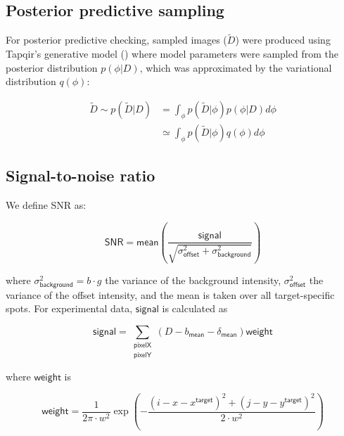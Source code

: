 \subsection{Posterior predictive sampling}

For posterior predictive checking, sampled images ($\widetilde{D}$) were produced using Tapqir's generative model () where model parameters were sampled from the posterior distribution $p(\phi|D)$, which was approximated by the variational distribution $q(\phi)$:

\begin{equation}
\begin{aligned}
    \widetilde{D} \sim p(\widetilde{D} | D) &= \int_\phi p(\widetilde{D} | \phi) p(\phi | D) d\phi \\
    &\simeq \int_\phi p(\widetilde{D} | \phi) q(\phi) d\phi
\end{aligned}
\end{equation}

\subsection{Signal-to-noise ratio}

We define SNR as:

\begin{equation}
    \mathsf{SNR} = \mathsf{mean} \left( \dfrac{\mathsf{signal}}{\sqrt{\sigma^2_{\mathsf{offset}} + \sigma^2_{\mathsf{background}}}} \right)
\end{equation}

where $\sigma^2_{\mathsf{background}} = b \cdot g$ the variance of the background intensity, $\sigma^2_{\mathsf{offset}}$ the variance of the offset intensity, and the mean is taken over all target-specific spots.  For experimental data, $\mathsf{signal}$ is calculated as

\begin{equation}
    \mathsf{signal} =  \sum_{\substack{\mathsf{pixelX} \\ \mathsf{pixelY}}} \left( D - b_{\mathsf{mean}} - \delta_\mathsf{mean} \right)  \mathsf{weight}
\end{equation}

where $\mathsf{weight}$ is

\begin{equation}
    \mathsf{weight} = \dfrac{1}{2 \pi \cdot w^2} \exp{\left( -\dfrac{(i-x-x^\mathsf{target})^2 + (j-y-y^\mathsf{target})^2}{2 \cdot w^2} \right)}
\end{equation}

